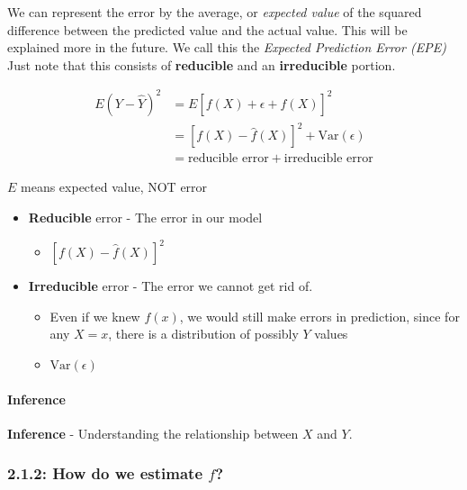We can represent the error by the average, or \emph{expected value} of the squared difference between the predicted value and the actual value.
This will be explained more in the future. We call this the \emph{Expected Prediction Error (EPE)} Just note that this consists of \textbf{reducible} and an \textbf{irreducible} portion.

\begin{align*}
E(Y-\hat Y)^2 &= E[f(X) + \epsilon + \hat f(X)]^2 \\
&= [f(X)-\hat f(X)]^2 + \text{Var}(\epsilon)\\
&= \text{reducible error} + \text{irreducible error}
\end{align*}

\begin{note}
    \(E\) means expected value, NOT error
\end{note}

\begin{itemize}
\tightlist
\item
  \textbf{Reducible} error - The error in our model

  \begin{itemize}
  \tightlist
  \item  \([f(X)-\hat f(X)]^2\)
  \end{itemize}
\item  \textbf{Irreducible} error - The error we cannot get rid of.

  \begin{itemize}
  \tightlist
  \item  Even if we knew \(f(x)\), we would still make errors in prediction, since for any \(X=x\), there is a distribution of possibly \(Y\) values
  \item  \(\text{Var}(\epsilon)\)
  \end{itemize}
\end{itemize}
\paragraph{Inference\\}
\textbf{Inference} - Understanding the relationship between \(X\) and
\(Y\).

\subsubsection*{\texorpdfstring{2.1.2: How do we estimate \(f\)?}{2.1.2: How do we estimate f?}}\label{how-do-we-estimate-f}

